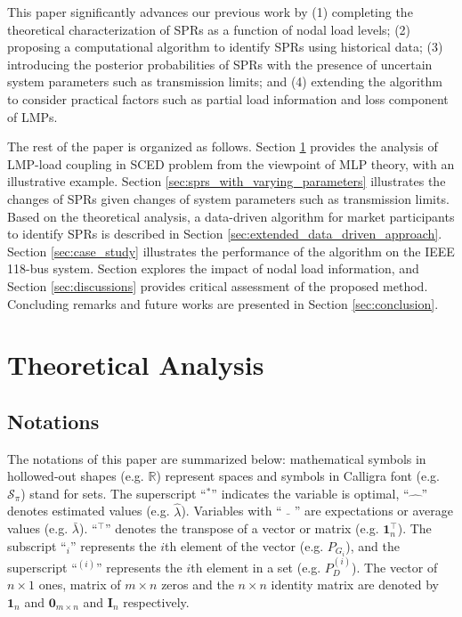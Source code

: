 \documentclass[letterpaper, 11pt]{article}
\theoremstyle{plain}
\theoremstyle{definition}
\begin{document}
This paper significantly advances our previous work by (1) completing the theoretical characterization of SPRs as a function of nodal load levels; (2) proposing a computational algorithm to identify SPRs using historical data; (3) introducing the posterior probabilities of SPRs with the presence of uncertain system parameters such as transmission limits; and (4) extending the algorithm to consider practical factors such as partial load information and loss component of LMPs.
 


The rest of the paper is organized as follows. 
Section \ref{sec:theoretical_analysis} provides the analysis of LMP-load coupling in SCED problem from the viewpoint of MLP theory, with an illustrative example. 
Section \ref{sec:sprs_with_varying_parameters} illustrates the changes of SPRs given changes of system parameters such as transmission limits. 
Based on the theoretical analysis, a data-driven algorithm for market participants to identify SPRs is described in Section \ref{sec:extended_data_driven_approach}. 
Section \ref{sec:case_study} illustrates the performance of the algorithm on the IEEE 118-bus system.
Section explores the impact of nodal load information, and Section \ref{sec:discussions} provides critical assessment
of the proposed method. Concluding remarks and future works
are presented in Section \ref{sec:conclusion}.











\section{Theoretical Analysis} \label{sec:theoretical_analysis}
\subsection{Notations} \label{sub:notations}
The notations of this paper are summarized below: mathematical symbols in hollowed-out shapes (e.g. $\mathbb{R}$) represent spaces and symbols in Calligra font (e.g. $\mathcal{S_{\pi}}$) stand for sets. The superscript ``$^*$'' indicates the variable is optimal, ``$\hat{\quad}$'' denotes estimated values (e.g. $\hat{\lambda}$). Variables with ``$\bar{\quad}$'' are expectations or average values (e.g. $\bar{\lambda}$). ``$^\intercal $'' denotes the transpose of a vector or matrix (e.g. $\mathbf{1}_{n}^\intercal $). The subscript ``$_i$'' represents the $i$th element of the vector (e.g. $P_{G_i}$), and the superscript ``$^{(i)}$'' represents the $i$th element in a set (e.g. $P_D^{(i)} $).
The vector of $n\times 1$ ones, matrix of $m\times n$ zeros and the $n\times n$ identity matrix are denoted by $\mathbf{1}_{n}$ and $\mathbf{0}_{m\times n}$ and $\mathbf{I}_n$ respectively.
\end{document}
